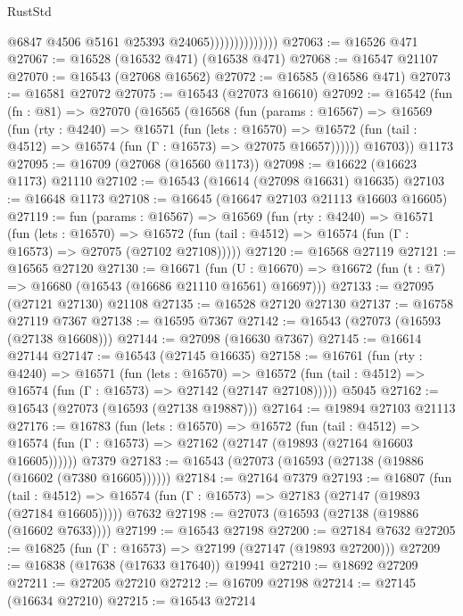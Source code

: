 \begin{lexlean}{RustStd}
\begin{coremodule}
                                @6847
                                @4506
                                @5161
                                @25393
                                @24065))))))))))))))
@27063 := @16526 @471
@27067 := @16528 (@16532 @471) (@16538 @471)
@27068 := @16547 @21107
@27070 := @16543 (@27068 @16562)
@27072 := @16585 (@16586 @471)
@27073 := @16581 @27072
@27075 := @16543 (@27073 @16610)
@27092 := @16542
    (fun (fn : @81) =>
    @27070
      (@16565
        (@16568
          (fun (params : @16567) =>
          @16569
            (fun (rty : @4240) =>
            @16571
              (fun (lets : @16570) =>
              @16572 (fun (tail : @4512) => @16574 (fun (Γ : @16573) => @27075 @16657))))))
        @16703))
    @1173
@27095 := @16709 (@27068 (@16560 @1173))
@27098 := @16622 (@16623 @1173) @21110
@27102 := @16543 (@16614 (@27098 @16631) @16635)
@27103 := @16648 @1173
@27108 := @16645 (@16647 @27103 @21113 @16603 @16605)
@27119 := fun (params : @16567) =>
  @16569
    (fun (rty : @4240) =>
    @16571
      (fun (lets : @16570) =>
      @16572 (fun (tail : @4512) => @16574 (fun (Γ : @16573) => @27075 (@27102 @27108)))))
@27120 := @16568 @27119
@27121 := @16565 @27120
@27130 := @16671
    (fun (U : @16670) => @16672 (fun (t : @7) => @16680 (@16543 (@16686 @21110 @16561) @16697)))
@27133 := @27095 (@27121 @27130) @21108
@27135 := @16528 @27120 @27130
@27137 := @16758 @27119 @7367
@27138 := @16595 @7367
@27142 := @16543 (@27073 (@16593 (@27138 @16608)))
@27144 := @27098 (@16630 @7367)
@27145 := @16614 @27144
@27147 := @16543 (@27145 @16635)
@27158 := @16761
    (fun (rty : @4240) =>
    @16571
      (fun (lets : @16570) =>
      @16572 (fun (tail : @4512) => @16574 (fun (Γ : @16573) => @27142 (@27147 @27108)))))
    @5045
@27162 := @16543 (@27073 (@16593 (@27138 @19887)))
@27164 := @19894 @27103 @21113
@27176 := @16783
    (fun (lets : @16570) =>
    @16572
      (fun (tail : @4512) =>
      @16574 (fun (Γ : @16573) => @27162 (@27147 (@19893 (@27164 @16603 @16605))))))
    @7379
@27183 := @16543 (@27073 (@16593 (@27138 (@19886 (@16602 (@7380 @16605))))))
@27184 := @27164 @7379
@27193 := @16807
    (fun (tail : @4512) => @16574 (fun (Γ : @16573) => @27183 (@27147 (@19893 (@27184 @16605)))))
    @7632
@27198 := @27073 (@16593 (@27138 (@19886 (@16602 @7633))))
@27199 := @16543 @27198
@27200 := @27184 @7632
@27205 := @16825 (fun (Γ : @16573) => @27199 (@27147 (@19893 @27200)))
@27209 := @16838 (@17638 (@17633 @17640)) @19941
@27210 := @18692 @27209
@27211 := @27205 @27210
@27212 := @16709 @27198
@27214 := @27145 (@16634 @27210)
@27215 := @16543 @27214

\end{coremodule}
\end{lexlean}
